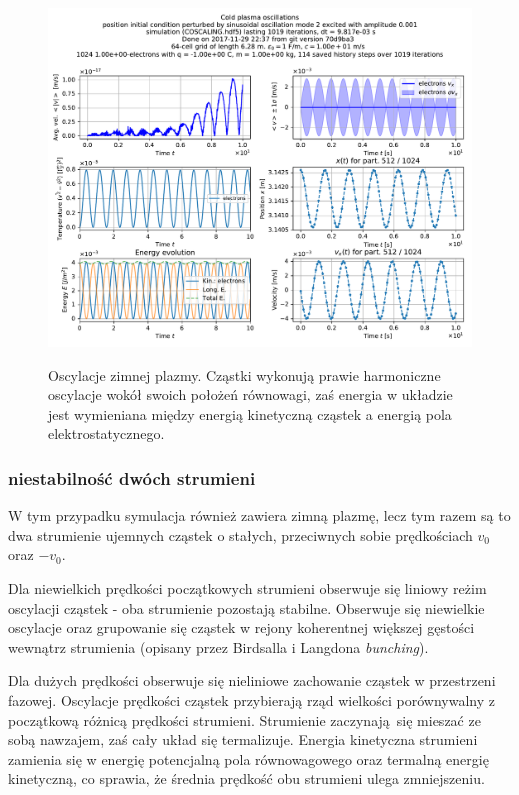 \begin{figure}[h!]
  \includegraphics[width=\textwidth]{Images/COSCALING}
  \label{fig:coldplasma}
  \caption{Oscylacje zimnej plazmy. Cząstki wykonują prawie harmoniczne oscylacje wokół swoich położeń równowagi, zaś energia
    w układzie jest wymieniana między energią kinetyczną cząstek a energią pola elektrostatycznego.}
\end{figure}

    \subsubsection{niestabilność dwóch strumieni}
W tym przypadku symulacja również zawiera zimną plazmę, lecz tym razem są to dwa strumienie ujemnych cząstek
o stałych, przeciwnych sobie prędkościach $v_0$ oraz $-v_0$.

    Dla niewielkich prędkości początkowych strumieni obserwuje się
    liniowy reżim oscylacji cząstek - oba strumienie pozostają stabilne. Obserwuje się niewielkie oscylacje oraz
grupowanie się cząstek w rejony koherentnej większej gęstości wewnątrz strumienia (opisany przez Birdsalla i Langdona \emph{bunching}).

    Dla dużych prędkości obserwuje się nieliniowe
    zachowanie cząstek w przestrzeni fazowej. Oscylacje prędkości cząstek przybierają rząd wielkości porównywalny
    z początkową różnicą prędkości strumieni.
 Strumienie zaczynają się mieszać ze sobą nawzajem, zaś cały układ się termalizuje. Energia kinetyczna
 strumieni zamienia się w energię potencjalną pola równowagowego 
oraz termalną energię kinetyczną, co sprawia, że średnia prędkość obu strumieni ulega zmniejszeniu.

